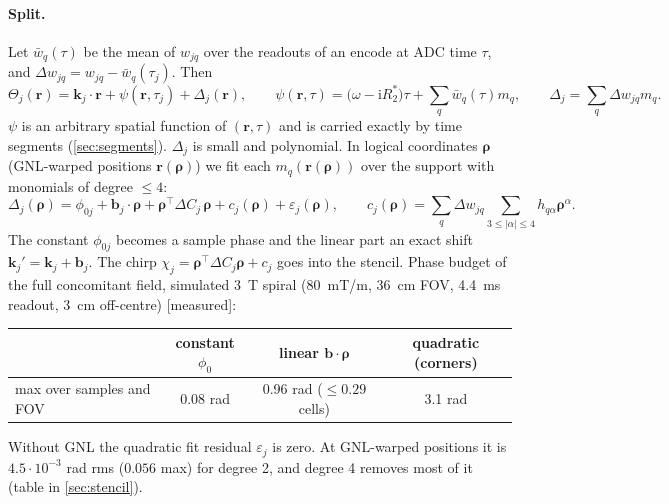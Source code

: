 \documentclass[11pt]{article}
\theoremstyle{remark}
\newcommand{\rr}{\bm r}
\newcommand{\kk}{\bm k}
\newcommand{\ii}{\mathrm i}
\begin{document}
\paragraph{Split.} Let $\bar w_q(\tau)$ be the mean of $w_{jq}$ over the readouts of an encode at ADC time $\tau$, and $\Delta w_{jq}=w_{jq}-\bar w_q(\tau_j)$. Then
\begin{equation}
  \Theta_j(\rr)=\kk_j\!\cdot\!\rr+\psi(\rr,\tau_j)+\Delta_j(\rr),\qquad
  \psi(\rr,\tau)=\bigl(\omega-\ii R_2^*\bigr)\tau+\sum_q\bar w_q(\tau)m_q,\qquad
  \Delta_j=\sum_q\Delta w_{jq}m_q .
  \label{eq:split}
\end{equation}
$\psi$ is an arbitrary spatial function of $(\rr,\tau)$ and is carried exactly by time segments (\cref{sec:segments}). $\Delta_j$ is small and polynomial.
In logical coordinates $\bm\rho$ (GNL-warped positions $\rr(\bm\rho)$) we fit each $m_q(\rr(\bm\rho))$ over the support with monomials of degree $\le4$:
\begin{equation}
  \Delta_j(\bm\rho)=\phi_{0j}+\bm b_j\!\cdot\!\bm\rho+\bm\rho^{\!\top}\Delta C_j\,\bm\rho+c_j(\bm\rho)+\varepsilon_j(\bm\rho),\qquad
  c_j(\bm\rho)=\sum_q\Delta w_{jq}\!\!\sum_{3\le|\alpha|\le4}\!\!h_{q\alpha}\bm\rho^\alpha .
  \label{eq:dC}
\end{equation}
The constant $\phi_{0j}$ becomes a sample phase and the linear part an exact shift $\kk_j'=\kk_j+\bm b_j$. The chirp $\chi_j=\bm\rho^{\!\top}\Delta C_j\bm\rho+c_j$ goes into the stencil.
Phase budget of the full concomitant field, simulated 3~T spiral (80~mT/m, 36~cm FOV, 4.4~ms readout, 3~cm off-centre) [measured]:
\begin{center}
\begin{tabular}{lccc}
\toprule
 & constant $\phi_0$ & linear $\bm b\!\cdot\!\bm\rho$ & quadratic (corners)\\
\midrule
max over samples and FOV & 0.08 rad & 0.96 rad ($\le0.29$ cells) & 3.1 rad\\
\bottomrule
\end{tabular}
\end{center}
Without GNL the quadratic fit residual $\varepsilon_j$ is zero. At GNL-warped positions it is $4.5\cdot10^{-3}$ rad rms ($0.056$ max) for degree 2, and degree 4 removes most of it (table in \cref{sec:stencil}).
\end{document}
